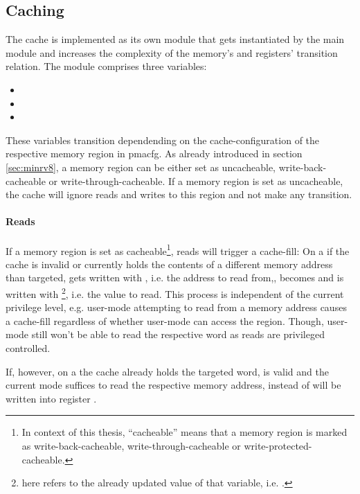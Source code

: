 \subsection{Caching}
\label{sec:implementation-caching}

The cache is implemented as its own module that gets instantiated by the main module and increases the complexity of the memory's and registers' transition relation.
The module comprises three variables:
\begin{itemize}
    \item {}
    \item {}
    \item {}
\end{itemize}

These variables transition dependending on the cache-configuration of the respective memory region in \gls{pmacfg}.
As already introduced in section \ref{sec:minrv8}, a memory region can be either set as uncacheable, write-back-cacheable or write-through-cacheable.
If a memory region is set as uncacheable, the cache will ignore reads and writes to this region and not make any transition.

\paragraph{Reads}
If a memory region is set as cacheable\footnote{%
    In context of this thesis, \enquote{cacheable} means that a memory region is marked as write-back-cacheable, write-through-cacheable or write-protected-cacheable.
}, reads will trigger a cache-fill:
On a  if the cache is invalid or currently holds the contents of a different memory address than targeted,  gets written with , i.e. the address to read from,,  becomes  and  is written with \footnote{%
     here refers to the already updated value of that variable, i.e. .
}, i.e. the value to read.
This process is independent of the current privilege level, e.g. user-mode attempting to read from a memory address causes a cache-fill regardless of whether user-mode can access the region.
Though, user-mode still won't be able to read the respective word as reads are privileged controlled.

If, however, on a  the cache already holds the targeted word, is valid and the current mode suffices to read the respective memory address,  instead of  will be written into register .

